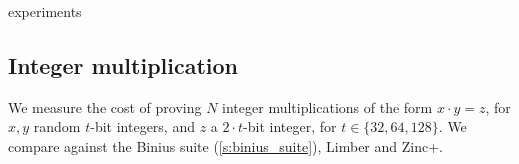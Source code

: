 \begin{lncsappendix}{experiments}

\subsection{Integer multiplication}\label{s:integer_exps}



We measure the cost of proving $N$ integer multiplications of the form $x\cdot  y = z$, for $x,y$ random $t$-bit integers, and $z$ a $2\cdot t$-bit integer, for $t\in \{32,64,128\}$.  We compare against the Binius suite (\cref{s:binius_suite}), Limber and Zinc+.


\end{lncsappendix}
